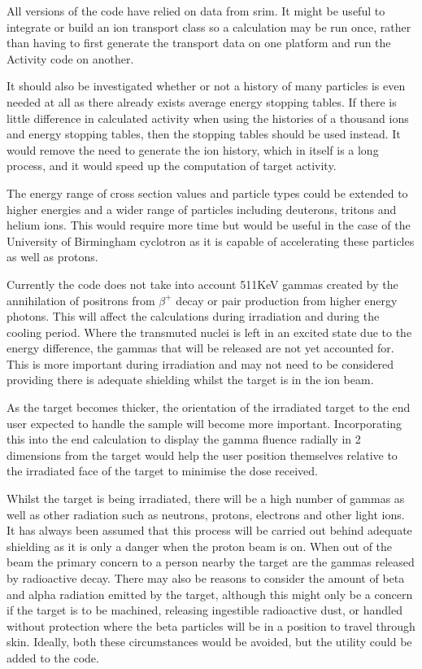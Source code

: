 All versions of the code have relied on data from \acrshort{srim}.  It might be useful to integrate or build an ion transport class so a calculation may be run once, rather than having to first generate the transport data on one platform and run the Activity code on another.  

It should also be investigated whether or not a history of many particles is even needed at all as there already exists average energy stopping tables.  If there is little difference in calculated activity when using the histories of a thousand ions and energy stopping tables, then the stopping tables should be used instead.  It would remove the need to generate the ion history, which in itself is a long process, and it would speed up the computation of target activity.

The energy range of cross section values and particle types could be extended to higher energies and a wider range of particles including deuterons, tritons and helium ions.  This would require more time but would be useful in the case of the University of Birmingham cyclotron as it is capable of accelerating these particles as well as protons.

Currently the code does not take into account 511KeV gammas created by the annihilation of positrons from $\beta^{+}$ decay or pair production from higher energy photons.  This will affect the calculations during irradiation and during the cooling period.  Where the transmuted nuclei is left in an excited state due to the energy difference, the gammas that will be released are not yet accounted for.  This is more important during irradiation and may not need to be considered providing there is adequate shielding whilst the target is in the ion beam.

As the target becomes thicker, the orientation of the irradiated target to the end user expected to handle the sample will become more important.  Incorporating this into the end calculation to display the gamma fluence radially in 2 dimensions from the target would help the user position themselves relative to the irradiated face of the target to minimise the dose received.

Whilst the target is being irradiated, there will be a high number of gammas as well as other radiation such as neutrons, protons, electrons and other light ions.  It has always been assumed that this process will be carried out behind adequate shielding as it is only a danger when the proton beam is on.  When out of the beam the primary concern to a person nearby the target are the gammas released by radioactive decay.  There may also be reasons to consider the amount of beta and alpha radiation emitted by the target, although this might only be a concern if the target is to be machined, releasing ingestible radioactive dust, or handled without protection where the beta particles will be in a position to travel through skin.  Ideally, both these circumstances would be avoided, but the utility could be added to the code.

